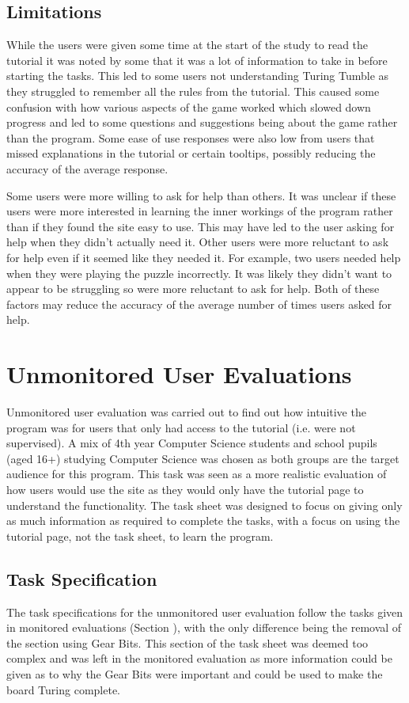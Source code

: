 \documentclass{l4proj}
\begin{document}
\subsection{Limitations}
While the users were given some time at the start of the study to read the tutorial it was noted by some that it was a lot of information to take in before starting the tasks. This led to some users not understanding Turing Tumble as they struggled to remember all the rules from the tutorial. This caused some confusion with how various aspects of the game worked which slowed down progress and led to some questions and suggestions being about the game rather than the program. Some ease of use responses were also low from users that missed explanations in the tutorial or certain tooltips, possibly reducing the accuracy of the average response.


Some users were more willing to ask for help than others. It was unclear if these users were more interested in learning the inner workings of the program rather than if they found the site easy to use. This may have led to the user asking for help when they didn't actually need it. Other users were more reluctant to ask for help even if it seemed like they needed it. For example, two users needed help when they were playing the puzzle incorrectly. It was likely they didn't want to appear to be struggling so were more reluctant to ask for help. Both of these factors may reduce the accuracy of the average number of times users asked for help.


\section{Unmonitored User Evaluations}
Unmonitored user evaluation was carried out to find out how intuitive the program was for users that only had access to the tutorial (i.e. were not supervised). A mix of 4th year Computer Science students and school pupils (aged 16+) studying Computer Science was chosen as both groups are the target audience for this program. This task was seen as a more realistic evaluation of how users would use the site as they would only have the tutorial page to understand the functionality. The task sheet was designed to focus on giving only as much information as required to complete the tasks, with a focus on using the tutorial page, not the task sheet, to learn the program. 

\subsection{Task Specification}
The task specifications for the unmonitored user evaluation follow the tasks given in monitored evaluations (Section ), with the only difference being the removal of the section using Gear Bits. This section of the task sheet was deemed too complex and was left in the monitored evaluation as more information could be given as to why the Gear Bits were important and could be used to make the board Turing complete. 
\end{document}
